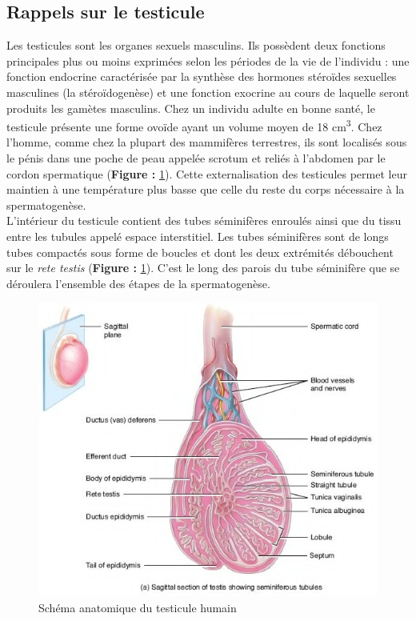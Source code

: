 \documentclass[12pt,twoside]{reedthesis}
\theoremstyle{definition}
\theoremstyle{definition}
\theoremstyle{remark}
\begin{document}
  \newpage
  
  \subsection{Rappels sur le testicule}\label{rappels-sur-le-testicule}
  
  Les testicules sont les organes sexuels masculins. Ils possèdent deux
  fonctions principales plus ou moins exprimées selon les périodes de la
  vie de l'individu : une fonction endocrine caractérisée par la synthèse
  des hormones stéroïdes sexuelles masculines (la stéroïdogenèse) et une
  fonction exocrine au cours de laquelle seront produits les gamètes
  masculins. Chez un individu adulte en bonne santé, le testicule présente
  une forme ovoïde ayant un volume moyen de 18 cm\textsuperscript{3}. Chez
  l'homme, comme chez la plupart des mammifères terrestres, ils sont
  localisés sous le pénis dans une poche de peau appelée scrotum et reliés
  à l'abdomen par le cordon spermatique (\textbf{Figure :}
  \ref{fig:testicule}). Cette externalisation des testicules permet leur
  maintien à une température plus basse que celle du reste du corps
  nécessaire à la spermatogenèse.\\
  L'intérieur du testicule contient des tubes séminifères enroulés ainsi
  que du tissu entre les tubules appelé espace interstitiel. Les tubes
  séminifères sont de longs tubes compactés sous forme de boucles et dont
  les deux extrémités débouchent sur le \emph{rete testis} (\textbf{Figure
  :} \ref{fig:testicule}). C'est le long des parois du tube séminifère que
  se déroulera l'ensemble des étapes de la spermatogenèse.
  
  \begin{figure}
  
  {\centering \includegraphics[scale=0.65]{figure/coupe_testicule2} 
  
  }
  
  \caption{Schéma anatomique du testicule humain}\label{fig:testicule}
  \end{figure}
  
\end{document}
